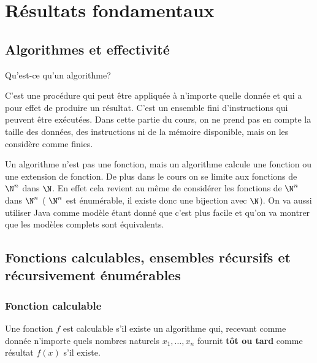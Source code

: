 
\chapter{Résultats fondamentaux}
\label{ch:r_sultats_fondamentaux}

\section{Algorithmes et effectivité}
\label{sec:algorithmes_et_effectivit_}
Qu'est-ce qu'un algorithme?

\begin{mydef}[Algorithme]
	C'est une procédure qui peut être appliquée à n'importe
	quelle donnée et qui a pour effet de produire un résultat. C'est un ensemble fini
	d'instructions qui peuvent être exécutées. Dans cette partie du cours, on ne prend pas  en compte la taille des données, des instructions ni de la mémoire disponible, mais on les considère comme finies.
\end{mydef}

\begin{myrem}
	Un algorithme n'est pas une fonction, mais un algorithme calcule une fonction ou une extension de fonction.
	De plus dans le cours on se limite aux fonctions de $\N^n$ dans $\N$. En effet cela revient au même de considérer les fonctions de $\N^n$ dans $\N^n$ (
	$\N^n$ est énumérable, il existe donc une bijection avec $\N$). On va aussi
	utiliser Java comme modèle étant donné que c'est plus facile et qu'on va montrer
	que les modèles complets sont équivalents.
\end{myrem}


\section{Fonctions calculables, ensembles récursifs et récursivement énumérables}
\label{sec:fonctions_calculables_ensembles_r_crusids_et_r_cursivement_num_rables}

\subsection{Fonction calculable}
\label{sub:fonction_calculable}

\begin{mydef}
	Une fonction $f$ est calculable s’il existe un algorithme qui, recevant comme donnée
	n'importe quels nombres naturels $x_1,\ldots,x_n$ fournit \textbf{tôt ou tard} comme
	résultat $f(x)$ s’il existe.
\end{mydef}

